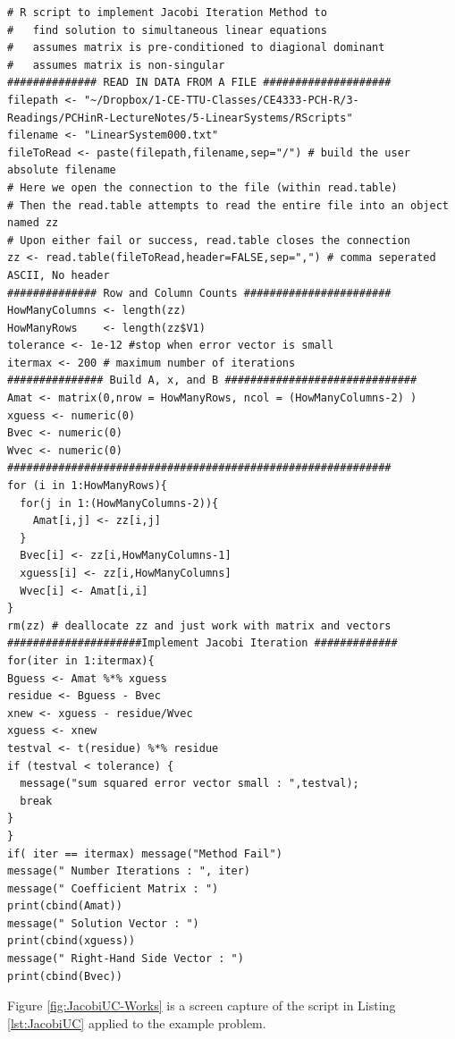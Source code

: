 \begin{lstlisting}[caption=R code demonstrating Jacobi Iteration , label=lst:JacobiUC]
# R script to implement Jacobi Iteration Method to 
#   find solution to simultaneous linear equations
#   assumes matrix is pre-conditioned to diagional dominant
#   assumes matrix is non-singular
############## READ IN DATA FROM A FILE ####################
filepath <- "~/Dropbox/1-CE-TTU-Classes/CE4333-PCH-R/3-Readings/PCHinR-LectureNotes/5-LinearSystems/RScripts"
filename <- "LinearSystem000.txt"
fileToRead <- paste(filepath,filename,sep="/") # build the user absolute filename
# Here we open the connection to the file (within read.table)
# Then the read.table attempts to read the entire file into an object named zz
# Upon either fail or success, read.table closes the connection
zz <- read.table(fileToRead,header=FALSE,sep=",") # comma seperated ASCII, No header
############## Row and Column Counts #######################
HowManyColumns <- length(zz)
HowManyRows    <- length(zz$V1)
tolerance <- 1e-12 #stop when error vector is small
itermax <- 200 # maximum number of iterations
############### Build A, x, and B ##############################
Amat <- matrix(0,nrow = HowManyRows, ncol = (HowManyColumns-2) )
xguess <- numeric(0)
Bvec <- numeric(0)
Wvec <- numeric(0)
############################################################
for (i in 1:HowManyRows){
  for(j in 1:(HowManyColumns-2)){
    Amat[i,j] <- zz[i,j]
  }
  Bvec[i] <- zz[i,HowManyColumns-1]
  xguess[i] <- zz[i,HowManyColumns]
  Wvec[i] <- Amat[i,i]
}
rm(zz) # deallocate zz and just work with matrix and vectors 
#####################Implement Jacobi Iteration #############
for(iter in 1:itermax){
Bguess <- Amat %*% xguess
residue <- Bguess - Bvec
xnew <- xguess - residue/Wvec
xguess <- xnew
testval <- t(residue) %*% residue
if (testval < tolerance) {
  message("sum squared error vector small : ",testval);
  break
}
}
if( iter == itermax) message("Method Fail")
message(" Number Iterations : ", iter)
message(" Coefficient Matrix : ")
print(cbind(Amat))
message(" Solution Vector : ")
print(cbind(xguess))
message(" Right-Hand Side Vector : ")
print(cbind(Bvec))
\end{lstlisting}

Figure \ref{fig:JacobiUC-Works} is a screen capture of the script in Listing \ref{lst:JacobiUC} applied to the example problem.


